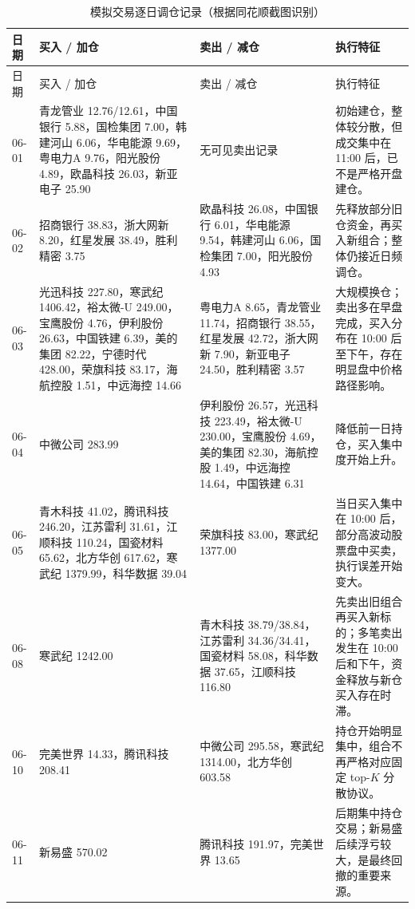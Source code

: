 \begingroup
\footnotesize
\setlength{\tabcolsep}{3pt}
\begin{longtable}{@{}p{}p{}p{}p{}@{}}
    \caption{模拟交易逐日调仓记录（根据同花顺截图识别）}
    \label{tab:daily_rebalance}\\
    \toprule
    日期 & 买入 / 加仓 & 卖出 / 减仓 & 执行特征 \\
    \midrule
    \endfirsthead
    \toprule
    日期 & 买入 / 加仓 & 卖出 / 减仓 & 执行特征 \\
    \midrule
    \endhead
    06-01 &
    青龙管业 12.76/12.61，中国银行 5.88，国检集团 7.00，韩建河山 6.06，华电能源 9.69，粤电力A 9.76，阳光股份 4.89，欧晶科技 26.03，新亚电子 25.90 &
    无可见卖出记录 &
    初始建仓，整体较分散，但成交集中在 11:00 后，已不是严格开盘建仓。 \\
    \midrule
    06-02 &
    招商银行 38.83，浙大网新 8.20，红星发展 38.49，胜利精密 3.75 &
    欧晶科技 26.08，中国银行 6.01，华电能源 9.54，韩建河山 6.06，国检集团 7.00，阳光股份 4.93 &
    先释放部分旧仓资金，再买入新组合；整体仍接近日频调仓。 \\
    \midrule
    06-03 &
    光迅科技 227.80，寒武纪 1406.42，裕太微-U 249.00，宝鹰股份 4.76，伊利股份 26.63，中国铁建 6.39，美的集团 82.22，宁德时代 428.00，荣旗科技 83.17，海航控股 1.51，中远海控 14.66 &
    粤电力A 8.65，青龙管业 11.74，招商银行 38.55，红星发展 42.72，浙大网新 7.90，新亚电子 24.50，胜利精密 3.57 &
    大规模换仓；卖出多在早盘完成，买入分布在 10:00 后至下午，存在明显盘中价格路径影响。 \\
    \midrule
    06-04 &
    中微公司 283.99 &
    伊利股份 26.57，光迅科技 223.49，裕太微-U 230.00，宝鹰股份 4.69，美的集团 82.30，海航控股 1.49，中远海控 14.64，中国铁建 6.31 &
    降低前一日持仓，买入集中度开始上升。 \\
    \midrule
    06-05 &
    青木科技 41.02，腾讯科技 246.20，江苏雷利 31.61，江顺科技 110.24，国瓷材料 65.62，北方华创 617.62，寒武纪 1379.99，科华数据 39.04 &
    荣旗科技 83.00，寒武纪 1377.00 &
    当日买入集中在 10:00 后，部分高波动股票盘中买卖，执行误差开始变大。 \\
    \midrule
    06-08 &
    寒武纪 1242.00 &
    青木科技 38.79/38.84，江苏雷利 34.36/34.41，国瓷材料 58.08，科华数据 37.65，江顺科技 116.80 &
    先卖出旧组合再买入新标的；多笔卖出发生在 10:00 后和下午，资金释放与新仓买入存在时滞。 \\
    \midrule
    06-10 &
    完美世界 14.33，腾讯科技 208.41 &
    中微公司 295.58，寒武纪 1314.00，北方华创 603.58 &
    持仓开始明显集中，组合不再严格对应固定 top-$K$ 分散协议。 \\
    \midrule
    06-11 &
    新易盛 570.02 &
    腾讯科技 191.97，完美世界 13.65 &
    后期集中持仓交易；新易盛后续浮亏较大，是最终回撤的重要来源。 \\
    \bottomrule
\end{longtable}
\endgroup


